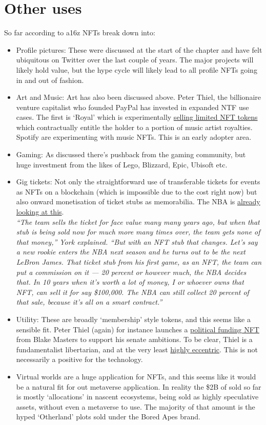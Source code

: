\section{Other uses}
So far according to a16z NFTs break down into:
\begin{itemize}
\item Profile pictures: These were discussed at the start of the chapter and have felt ubiquitous on Twitter over the last couple of years. The major projects will likely hold value, but the hype cycle will likely lead to all profile NFTs going in and out of fashion.
\item Art and Music: Art has also been discussed above. Peter Thiel, the billionaire venture capitalist who founded PayPal has invested in expanded NTF use cases. The first is `Royal' which is experimentally \href{https://royal.io/}{selling limited NFT tokens} which contractually entitle the holder to a portion of music artist royalties. Spotify are experimenting with music NFTs. This is an early adopter area.
\item Gaming: As discussed there's pushback from the gaming community, but huge investment from the likes of Lego, Blizzard, Epic, Ubisoft etc.
\item Gig tickets: Not only the straightforward use of transferable tickets for events as NFTs on a blockchain (which is impossible due to the cost right now) but also onward monetisation of ticket stubs as memorabilia. The NBA is \href{https://deadspin.com/investing-in-nft-ticket-stubs-is-likely-one-of-the-nba-1848991991}{already looking at this}.\\
\textit{``The team sells the ticket for face value many many years ago, but when that stub is being sold now for much more many times over, the team gets none of that money,'' York explained. ``But with an NFT stub that changes. Let’s say a new rookie enters the NBA next season and he turns out to be the next LeBron James. That ticket stub from his first game, as an NFT, the team can put a commission on it — 20 percent or however much, the NBA decides that. In 10 years when it’s worth a lot of money, I or whoever owns that NFT, can sell it for say \$100,000. The NBA can still collect 20 percent of that sale, because it’s all on a smart contract.''}
\item Utility: These are broadly `membership' style tokens, and this seems like a sensible fit. Peter Thiel (again) for instance launches a \href{https://www.ztonft.com/}{political funding NFT} from Blake Masters to support his senate ambitions. To be clear, Thiel is a fundamentalist libertarian, and at the very least \href{https://gizmodo.com/peter-thiel-bitcoin-talk-miami-2022-1848764790}{highly eccentric}. This is not necessarily a positive for the technology.
\item Virtual worlds are a huge application for NFTs, and this seems like it would be a natural fit for out metaverse application. In reality the \$2B of sold so far is mostly `allocations' in nascent ecosystems, being sold as highly speculative assets, without even a metaverse to use. The majority of that amount is the hyped `Otherland' plots sold under the Bored Apes brand.
\end{itemize}
